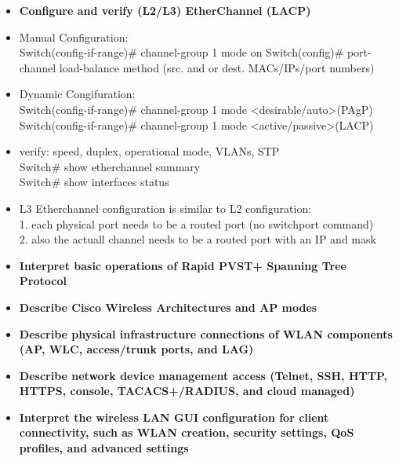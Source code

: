 \documentclass{article}
\begin{document}
\begin{itemize}
  \item \textbf{Configure and verify (L2/L3) EtherChannel (LACP)}
	\item[] Manual Configuration:\\
		Switch(config-if-range)\# channel-group 1 mode on
		Switch(config)\# port-channel load-balance method (src. and or dest. MACs/IPs/port numbers)
	\item[] Dynamic Congifuration:\\
		Switch(config-if-range)\# channel-group 1 mode \textless desirable/auto\textgreater (PAgP)\\
		Switch(config-if-range)\# channel-group 1 mode \textless active/passive\textgreater (LACP)
	\item[] verify: speed, duplex, operational mode, VLANs, STP\\
		Switch\# show etherchannel summary\\
		Switch\# show interfaces status
	\item[] L3 Etherchannel configuration is similar to L2 configuration:\\
		1. each physical port needs to be a routed port (no switchport command)\\
		2. also the actuall channel needs to be a routed port with an IP and mask\\
  \item \textbf{Interpret basic operations of Rapid PVST+ Spanning Tree Protocol}
  \item \textbf{Describe Cisco Wireless Architectures and AP modes}
  \item \textbf{Describe physical infrastructure connections of WLAN components (AP, WLC, access/trunk ports, and LAG)}
  \item \textbf{Describe network device management access (Telnet, SSH, HTTP, HTTPS, console, TACACS+/RADIUS, and cloud managed)}
  \item \textbf{Interpret the wireless LAN GUI configuration for client connectivity, such as WLAN creation, security settings, QoS profiles, and advanced settings}\\
\end{itemize}
\end{document}
